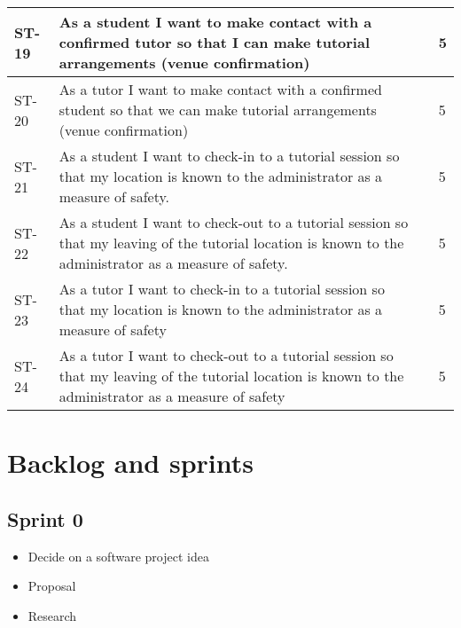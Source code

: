 \documentclass[12pt]{article}
\begin{document}
{\begin{longtable}{| p{1cm} | p{7cm}| p{5cm} | p{1cm} |}
			\\ \hline ST-19 & As a student I want to make contact with a confirmed tutor so that I can make tutorial arrangements (venue confirmation) & &5 
			
			\\ \hline ST-20 &As a tutor I want to make contact with a confirmed student so that we can make tutorial arrangements (venue confirmation)  & &5

			\\ \hline ST-21 & As a student I want to check-in to a tutorial session so that my location is known to the administrator as a measure of safety.  & &5 
			
			\\ \hline ST-22 & As a student I want to check-out to a tutorial session so that my leaving of the tutorial location is known to the administrator as a measure of safety.  & &5 
			
			\\ \hline ST-23 & As a tutor I want to check-in to a tutorial session so that my location is known to the administrator as a measure of safety  & &5 
			
			\\ \hline ST-24 & As a tutor I want to check-out to a tutorial session so that my leaving of the tutorial location is known to the administrator as a measure of safety  & &5 \\ \hline
\end{longtable}
}

\newpage
\section{Backlog and sprints}
\subsection{Sprint 0}
\begin{itemize}
\item Decide on a software project idea
\item Proposal
\item Research
\end{itemize}

\end{document}

